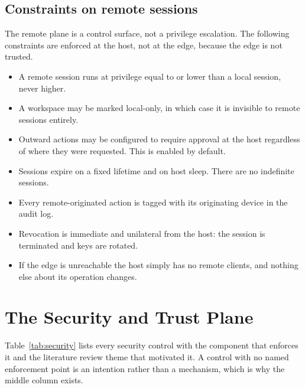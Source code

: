 \documentclass[11pt]{article}
\begin{document}
\subsection{Constraints on remote sessions}

The remote plane is a control surface, not a privilege escalation. The following
constraints are enforced at the host, not at the edge, because the edge is not trusted.

\begin{itemize}
  \item A remote session runs at privilege equal to or lower than a local session, never
        higher.
  \item A workspace may be marked local-only, in which case it is invisible to remote
        sessions entirely.
  \item Outward actions may be configured to require approval at the host regardless of
        where they were requested. This is enabled by default.
  \item Sessions expire on a fixed lifetime and on host sleep. There are no indefinite
        sessions.
  \item Every remote-originated action is tagged with its originating device in the audit
        log.
  \item Revocation is immediate and unilateral from the host: the session is terminated
        and keys are rotated.
  \item If the edge is unreachable the host simply has no remote clients, and nothing
        else about its operation changes.
\end{itemize}

\section{The Security and Trust Plane}

Table~\ref{tab:security} lists every security control with the component that enforces it
and the literature review theme that motivated it. A control with no named enforcement
point is an intention rather than a mechanism, which is why the middle column exists.
\end{document}
